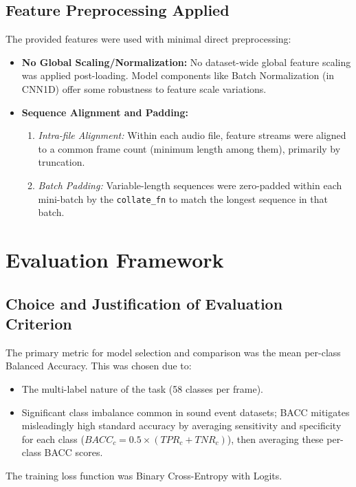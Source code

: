 \documentclass{article}
\begin{document}
\subsection{Feature Preprocessing Applied}

The provided features were used with minimal direct preprocessing:
\begin{itemize}
    \item \textbf{No Global Scaling/Normalization:} No dataset-wide global feature scaling was applied post-loading. Model components like Batch Normalization (in CNN1D) offer some robustness to feature scale variations.
    \item \textbf{Sequence Alignment and Padding:}
    \begin{enumerate}[label=(\roman*)]
        \item \textit{Intra-file Alignment:} Within each audio file, feature streams were aligned to a common frame count (minimum length among them), primarily by truncation.
        \item \textit{Batch Padding:} Variable-length sequences were zero-padded within each mini-batch by the \texttt{collate\_fn} to match the longest sequence in that batch.
    \end{enumerate}
\end{itemize}

\section{Evaluation Framework}
\label{sec:evaluation_framework}

\subsection{Choice and Justification of Evaluation Criterion}
The primary metric for model selection and comparison was the mean per-class Balanced Accuracy. This was chosen due to:
\begin{itemize}
    \item The multi-label nature of the task (58 classes per frame).
    \item Significant class imbalance common in sound event datasets; BACC mitigates misleadingly high standard accuracy by averaging sensitivity and specificity for each class ($BACC_c = 0.5 \times (TPR_c + TNR_c)$), then averaging these per-class BACC scores.
\end{itemize}
The training loss function was Binary Cross-Entropy with Logits.
\end{document}
